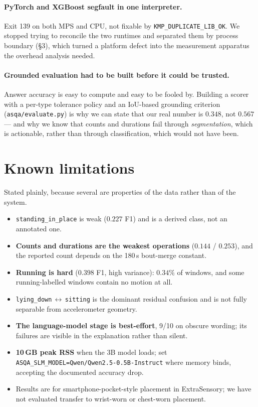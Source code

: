 \documentclass[11pt,a4paper]{article}
\newcommand{\code}[1]{\texttt{\small #1}}
\begin{document}
\paragraph{PyTorch and XGBoost segfault in one interpreter.} Exit 139 on both MPS and
CPU, not fixable by \code{KMP\_DUPLICATE\_LIB\_OK}. We stopped trying to reconcile the
two runtimes and separated them by process boundary (\S3), which turned a platform
defect into the measurement apparatus the overhead analysis needed.

\paragraph{Grounded evaluation had to be built before it could be trusted.} Answer
accuracy is easy to compute and easy to be fooled by. Building a scorer with a per-type
tolerance policy and an IoU-based grounding criterion (\code{asqa/evaluate.py}) is why we
can state that our real number is $0.348$, not $0.567$ --- and why we know that counts
and durations fail through \emph{segmentation}, which is actionable, rather than through
classification, which would not have been.

\section{Known limitations}

Stated plainly, because several are properties of the data rather than of the system.

\begin{itemize}
\item \code{standing\_in\_place} is weak ($0.227$ F1) and is a derived class, not an
annotated one.
\item \textbf{Counts and durations are the weakest operations} ($0.144$ / $0.253$), and
the reported count depends on the 180\,s bout-merge constant.
\item \textbf{Running is hard} ($0.398$ F1, high variance): $0.34\%$ of windows, and some
running-labelled windows contain no motion at all.
\item \code{lying\_down}\,$\leftrightarrow$\,\code{sitting} is the dominant residual
confusion and is not fully separable from accelerometer geometry.
\item \textbf{The language-model stage is best-effort}, 9/10 on obscure wording; its
failures are visible in the explanation rather than silent.
\item \textbf{10\,GB peak RSS} when the 3B model loads; set
\code{ASQA\_SLM\_MODEL=Qwen/Qwen2.5-0.5B-Instruct} where memory binds, accepting the
documented accuracy drop.
\item Results are for smartphone-pocket-style placement in ExtraSensory; we have not
evaluated transfer to wrist-worn or chest-worn placement.
\end{itemize}
\end{document}
